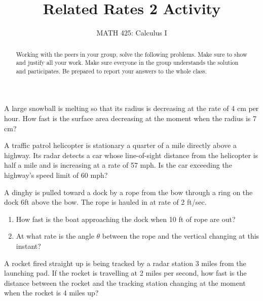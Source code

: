 \documentclass{ximera}
\title{Related Rates 2 Activity}
\author{MATH 425: Calculus I}
\begin{document}
\begin{abstract}
   Working with the peers in your group, solve the following problems. Make sure to show and justify all your work. Make sure everyone in the group understands the solution and participates. Be prepared to report your answers to the whole class. 
\end{abstract}
\maketitle

\begin{exercise}
    A large snowball is melting so that its radius is decreasing at the rate of 4 cm per hour.  How fast is the surface area decreasing at the moment when the radius is 7 cm? 
\end{exercise}
    
\begin{exercise}
    A traffic patrol helicopter is stationary a quarter of a mile directly above a highway.  Its radar detects a car whose line-of-sight distance from the helicopter is half a mile and is increasing at a rate of 57 mph.  Is the car exceeding the highway's speed limit of 60 mph?\\
\end{exercise}
   
\begin{exercise}  
    A dinghy is pulled toward a dock by a rope from the bow through a ring on the dock 6ft above the bow.  The rope is hauled in at rate of 2 ft/sec.  
    \begin{enumerate}
    \item How fast is the boat approaching the dock when 10 ft of rope are out?\\
        
        \item At what rate is the angle $\theta$ between the rope and the vertical changing at this instant? 
     \end{enumerate}
\end{exercise}   

\begin{exercise}
    A rocket fired straight up is being tracked by a radar station 3 miles from the launching pad.  If the rocket is travelling at 2 miles per second, how fast is the distance between the rocket and the tracking station changing at the moment when the rocket is 4 miles up?\\
\end{exercise}
    
 
\end{document}
